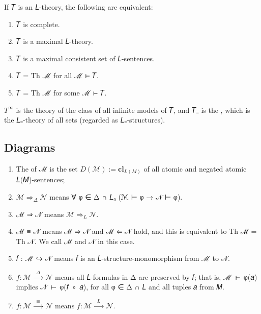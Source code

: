 \documentclass[a4paper,UKenglish,cleveref,autoref,thm-restate,12pt]{lipics-v2021-wjd}
\newcommand{\<}{\langle}
\renewcommand{\>}{\rangle}
\begin{document}
\begin{lemma} If 𝑇 is an 𝐿-theory, the
  following are equivalent:
  \begin{enumerate}
  \def\labelenumi{\arabic{enumi}.}
  \item 𝑇 is complete.
  \item 𝑇 is a maximal 𝐿-theory.
  \item 𝑇 is a maximal consistent set of 𝐿-sentences.
  \item 𝑇 = Th ℳ for all ℳ ⊢ 𝑇.
  \item 𝑇 = Th ℳ for some ℳ ⊢ 𝑇.
  \end{enumerate}
\end{lemma}

\begin{examples*}
\(T^∞\) is the theory of the class of all infinite models of 𝑇, and 𝑇₌ is the , which is the 𝐿₌-theory of all sets (regarded as 𝐿₌-structures). 
\end{examples*}
\subsection{Diagrams}\label{diagrams}
\begin{enumerate}
\item The  of ℳ is the set \(𝐷(ℳ) := \mathbf{cl}_{𝐿(𝑀)}\) of all
  atomic and negated atomic 𝐿(𝑀)-sentences;
\item
  \(ℳ ⇒_Δ 𝒩\) means ∀ φ ∈ Δ ∩ 𝐿₀ (ℳ ⊢ φ → 𝒩 ⊢ φ).
\item
  ℳ ⇒ 𝒩 means \(ℳ ⇒_𝐿 𝒩\).
\item
  ℳ ≡ 𝒩 means ℳ ⇒ 𝒩 and ℳ ⇐ 𝒩 hold, and this is equivalent to Th ℳ = Th 𝒩.
  We call ℳ and 𝒩  in this case.
\item
  𝑓 : ℳ ↪ 𝒩 means 𝑓 is an 𝐿-structure-monomorphism from ℳ to 𝒩.
\item
  \(𝑓 : ℳ \stackrel{Δ}{⟶} 𝒩\) means all 𝐿-formulas in Δ are preserved by 𝑓; that
  is, ℳ~⊢~φ(𝑎) implies 𝒩~⊢~φ(𝑓~∘~𝑎), for all φ ∈ Δ ∩ 𝐿 and all tuples 𝑎 from 𝑀.
\item
  \(𝑓 : ℳ \stackrel{≡}{⟶} 𝒩\) means \(𝑓 : ℳ \stackrel{L}{⟶} 𝒩\).
\end{enumerate}
\end{document}
